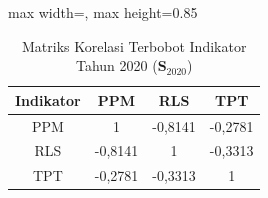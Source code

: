 \begin{table}[H]
\centering
\caption{Matriks Korelasi Terbobot Indikator Tahun 2020 ($\mathbf{S}_{2020}$)} \label{tab:sample2matriks_intra_loading_2020}
\begin{adjustbox}{max width=\textwidth, max height=0.85\textheight}
\begin{tabular}{|c|c|c|c|}
\hline
\textbf{Indikator} & \textbf{PPM} & \textbf{RLS} & \textbf{TPT} \\
\hline
PPM & 1 & -0,8141 & -0,2781 \\
RLS & -0,8141 & 1 & -0,3313 \\
TPT & -0,2781 & -0,3313 & 1 \\
\hline
\end{tabular}
\end{adjustbox}
\end{table}